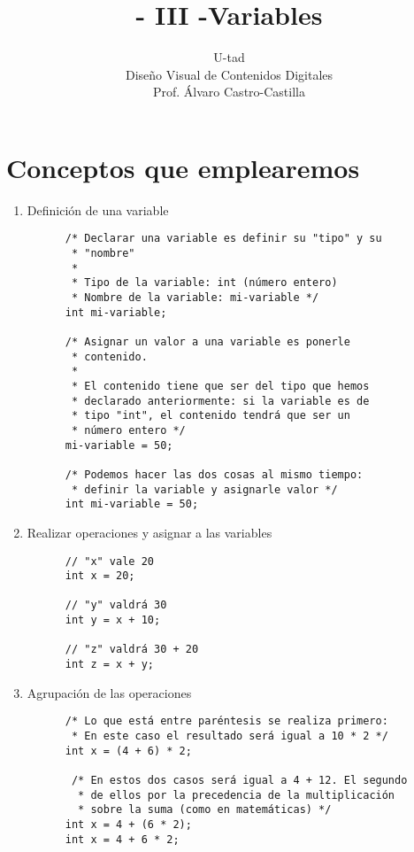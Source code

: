 \documentclass[a4paper,oneside]{article}
\title{- III -\linebreak Variables}
\author{U-tad\\ Diseño Visual de Contenidos Digitales\\ Prof. Álvaro Castro-Castilla}
\date{}
\begin{document}
\maketitle


\section{Conceptos que emplearemos}
\begin{enumerate}
  \item Definición de una variable

    \begin{verbatim}
      /* Declarar una variable es definir su "tipo" y su
       * "nombre"
       *
       * Tipo de la variable: int (número entero)
       * Nombre de la variable: mi-variable */
      int mi-variable;

      /* Asignar un valor a una variable es ponerle
       * contenido.
       *
       * El contenido tiene que ser del tipo que hemos
       * declarado anteriormente: si la variable es de
       * tipo "int", el contenido tendrá que ser un
       * número entero */
      mi-variable = 50;

      /* Podemos hacer las dos cosas al mismo tiempo:
       * definir la variable y asignarle valor */
      int mi-variable = 50;
    \end{verbatim}

  \item Realizar operaciones y asignar a las variables

    \begin{verbatim}
      // "x" vale 20
      int x = 20;

      // "y" valdrá 30
      int y = x + 10;

      // "z" valdrá 30 + 20
      int z = x + y;
    \end{verbatim}

  \newpage
  \item Agrupación de las operaciones

    \begin{verbatim}
      /* Lo que está entre paréntesis se realiza primero:
       * En este caso el resultado será igual a 10 * 2 */
      int x = (4 + 6) * 2;

       /* En estos dos casos será igual a 4 + 12. El segundo
        * de ellos por la precedencia de la multiplicación
        * sobre la suma (como en matemáticas) */
      int x = 4 + (6 * 2);
      int x = 4 + 6 * 2;
    \end{verbatim}


\end{enumerate}
\end{document}
